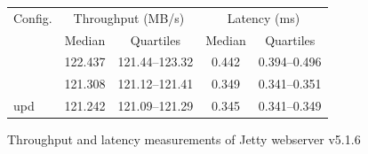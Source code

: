 \begin{figure}[t]
\begin{small}
\begin{center}
\begin{tabular}{|l|c|c|c|c|} \hline \T
Config.                & \multicolumn{2}{c|}{Throughput (MB/s)}  & \multicolumn{2}{c|}{Latency (ms)} \\ \cline{2-5}
                       & Median   & Quartiles \T                 & Median & Quartiles                \\ \hline \T
\JikesRVM{}            & 122.437  & 121.44--123.32               & 0.442  & 0.394--0.496             \\
\DSU{}                 & 121.308  & 121.12--121.41               & 0.349  & 0.341--0.351             \\
\DSU{} upd             & 121.242  & 121.09--121.29               & 0.345  & 0.341--0.349             \\ \hline
\end{tabular}
\end{center}
\end{small}
\begin{center}
\caption{Throughput and latency measurements of Jetty webserver v5.1.6\label{fig:jetty}}
\end{center}
\end{figure}
